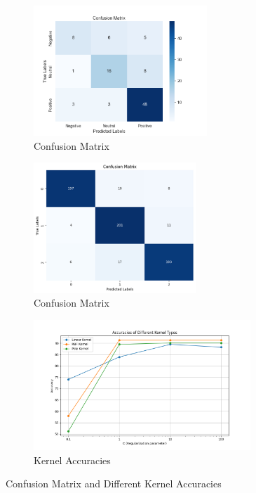\documentclass[11pt,article,oneside]{article}
\begin{document}
\begin{figure}[H]
    \centering
    \begin{subfigure}[b]{0.4\textwidth}
        \includegraphics[width=\linewidth, height=4.9cm]{images/confusion_matrix.png}
        \caption{Confusion Matrix}
        \label{fig:subfig1}
    \end{subfigure}
    \begin{subfigure}[b]{0.4\textwidth}
        \includegraphics[width=\linewidth, height=4.9cm]{images/ConfusionMatrixafterBalance.png}
        \caption{Confusion Matrix}
        \label{fig:subfig1}
    \end{subfigure}
    \hfill
    \begin{subfigure}[b]{0.57\textwidth}
        \includegraphics[width=\linewidth, height=4.9cm]{images/kernel_accuracies.png}
        \caption{Kernel Accuracies}
        \label{fig:comparison}
    \end{subfigure}

    \caption{Confusion Matrix and Different Kernel Accuracies}
    \label{fig:overall_label}
\end{figure}
\end{document}
